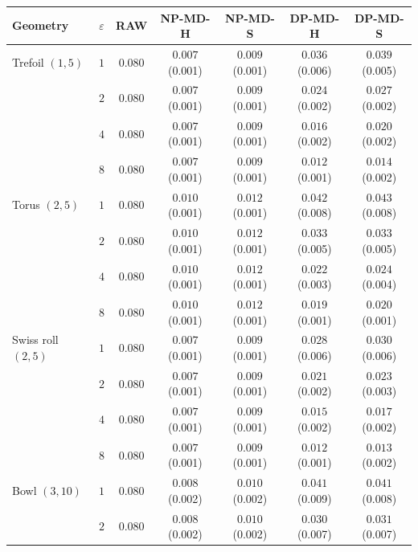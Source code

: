 \begin{tabular}{lcccccc}
\toprule
Geometry & $\varepsilon$ & RAW & NP-MD-H & NP-MD-S & DP-MD-H & DP-MD-S \\
\midrule
Trefoil $(1,5)$ & $1$ & $0.080$ & $0.007$ \scriptsize(0.001) & $0.009$ \scriptsize(0.001) & $0.036$ \scriptsize(0.006) & $0.039$ \scriptsize(0.005) \\
 & $2$ & $0.080$ & $0.007$ \scriptsize(0.001) & $0.009$ \scriptsize(0.001) & $0.024$ \scriptsize(0.002) & $0.027$ \scriptsize(0.002) \\
 & $4$ & $0.080$ & $0.007$ \scriptsize(0.001) & $0.009$ \scriptsize(0.001) & $0.016$ \scriptsize(0.002) & $0.020$ \scriptsize(0.002) \\
 & $8$ & $0.080$ & $0.007$ \scriptsize(0.001) & $0.009$ \scriptsize(0.001) & $0.012$ \scriptsize(0.001) & $0.014$ \scriptsize(0.002) \\
\midrule
Torus $(2,5)$ & $1$ & $0.080$ & $0.010$ \scriptsize(0.001) & $0.012$ \scriptsize(0.001) & $0.042$ \scriptsize(0.008) & $0.043$ \scriptsize(0.008) \\
 & $2$ & $0.080$ & $0.010$ \scriptsize(0.001) & $0.012$ \scriptsize(0.001) & $0.033$ \scriptsize(0.005) & $0.033$ \scriptsize(0.005) \\
 & $4$ & $0.080$ & $0.010$ \scriptsize(0.001) & $0.012$ \scriptsize(0.001) & $0.022$ \scriptsize(0.003) & $0.024$ \scriptsize(0.004) \\
 & $8$ & $0.080$ & $0.010$ \scriptsize(0.001) & $0.012$ \scriptsize(0.001) & $0.019$ \scriptsize(0.001) & $0.020$ \scriptsize(0.001) \\
\midrule
Swiss roll $(2,5)$ & $1$ & $0.080$ & $0.007$ \scriptsize(0.001) & $0.009$ \scriptsize(0.001) & $0.028$ \scriptsize(0.006) & $0.030$ \scriptsize(0.006) \\
 & $2$ & $0.080$ & $0.007$ \scriptsize(0.001) & $0.009$ \scriptsize(0.001) & $0.021$ \scriptsize(0.002) & $0.023$ \scriptsize(0.003) \\
 & $4$ & $0.080$ & $0.007$ \scriptsize(0.001) & $0.009$ \scriptsize(0.001) & $0.015$ \scriptsize(0.002) & $0.017$ \scriptsize(0.002) \\
 & $8$ & $0.080$ & $0.007$ \scriptsize(0.001) & $0.009$ \scriptsize(0.001) & $0.012$ \scriptsize(0.001) & $0.013$ \scriptsize(0.002) \\
\midrule
Bowl $(3,10)$ & $1$ & $0.080$ & $0.008$ \scriptsize(0.002) & $0.010$ \scriptsize(0.002) & $0.041$ \scriptsize(0.009) & $0.041$ \scriptsize(0.008) \\
 & $2$ & $0.080$ & $0.008$ \scriptsize(0.002) & $0.010$ \scriptsize(0.002) & $0.030$ \scriptsize(0.007) & $0.031$ \scriptsize(0.007) \\

\end{tabular}
